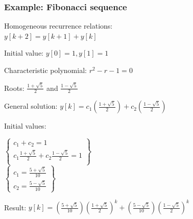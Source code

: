 \begin{frame}

	\frametitle{Example: Fibonacci sequence}
	\begin{example}
		\begin{itemize}
			
			\footnotesize{
			\setlength\itemsep{0em}
			\item Homogeneous recurrence relations: \\ $y[k+2] = y[k+1] + y[k]$
			\item Initial value: $y[0]=1, y[1]= 1$
			\item Characteristic polynomial: $r^2 - r - 1=0$ 
			\item Roots: $\frac{1+\sqrt{5}}{2}$ and $\frac{1-\sqrt{5}}{2}$
			\item General solution: $y[k] = c_1(\frac{1+\sqrt{5}}{2}) + c_2(\frac{1-\sqrt{5}}{2})$
			\item Initial values: 
			\begin{center}
				$
				\begin{Bmatrix}
				c_1+ c_2 = 1\\
				c_1 \frac{1+\sqrt{5}}{2} + c_2 \frac{1-\sqrt{5}}{2} = 1  \\
				\end{Bmatrix}
				$\\
				$
				\begin{Bmatrix}
				c_1 = \frac{5+\sqrt{5}}{10}  \\
				c_2 = \frac{5-\sqrt{5}}{10}
				\end{Bmatrix}
				$\\
			\end{center}
			\item Result: $y[k] =  (\frac{5+\sqrt{5}}{10})(\frac{1+\sqrt{5}}{2})^{k} +(\frac{5-\sqrt{5}}{10}) (\frac{1-\sqrt{5}}{2})^{k}$}
		\end{itemize}
	\end{example}
\end{frame}
